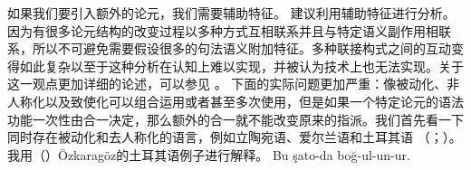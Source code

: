 \noindent
如果我们要引入额外的论元，我们需要辅助特征。 \citet{Koenig99a}建议利用辅助特征进行分析。因为有很多论元结构的改变过程以多种方式互相联系并且与特定语义副作用相联系，所以不可避免需要假设很多的句法语义附加特征。多种联接构式之间的互动变得如此复杂以至于这种分析在认知上难以实现，并被认为技术上也无法实现。关于这一观点更加详细的论述，可以参见 。
下面的实际问题更加严重：像被动化、非人称化以及致使化可以组合运用或者甚至多次使用，但是如果一个特定论元的语法功能一次性由合一决定，那么额外的合一就不能改变原来的指派。我们首先看一下同时存在被动化和去人称化的语言，例如立陶宛语\citep[\S~5]{Timberlake82a}、爱尔兰语\citep{Noonan94a}和土耳其语 （\citealp{Ozkaragoez86a}；\citealp[\S~2.3.3]{Knecht85a-u}）。我用（）Özkaragöz的土耳其语例子进行解释\citeyearpar[]{Ozkaragoez86a}。
\eal\label{ex-double-passivization}
\ex\label{ex-double-passivization-strangle}
\gll Bu şato-da boğ-ul-un-ur.\\
